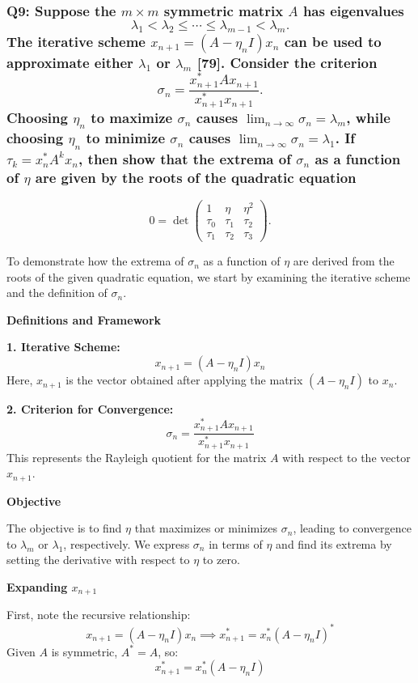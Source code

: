 \documentclass[8pt]{article}
\begin{document}
{{\subsubsection*{Q9: Suppose the \(m \times m\) symmetric matrix \(A\) has eigenvalues
\[
\lambda_1 < \lambda_2 \le \cdots \le \lambda_{m-1} < \lambda_m.
\]
The iterative scheme \(x_{n+1} = (A - \eta_n I)x_n\) can be used to approximate either \(\lambda_1\) or \(\lambda_m\) [79]. Consider the criterion
\[
\sigma_n = \frac{x_{n+1}^* A x_{n+1}}{x_{n+1}^* x_{n+1}}.
\]
Choosing \(\eta_n\) to maximize \(\sigma_n\) causes \(\lim_{n \to \infty} \sigma_n = \lambda_m\), while choosing \(\eta_n\) to minimize \(\sigma_n\) causes \(\lim_{n \to \infty} \sigma_n = \lambda_1\). If \(\tau_k = x_n^* A^k x_n\), then show that the extrema of \(\sigma_n\) as a function of \(\eta\) are given by the roots of the quadratic equation}
\[
0 = \det \begin{pmatrix}
1 & \eta & \eta^2 \\
\tau_0 & \tau_1 & \tau_2 \\
\tau_1 & \tau_2 & \tau_3
\end{pmatrix}.
\]

To demonstrate how the extrema of \(\sigma_n\) as a function of \(\eta\) are derived from the roots of the given quadratic equation, we start by examining the iterative scheme and the definition of \(\sigma_n\).

\textbf{Definitions and Framework}

\textbf{1. Iterative Scheme:}
   \[
   x_{n+1} = (A - \eta_n I)x_n
   \]
   Here, \(x_{n+1}\) is the vector obtained after applying the matrix \((A - \eta_n I)\) to \(x_n\).

\textbf{2. Criterion for Convergence:}
   \[
   \sigma_n = \frac{x_{n+1}^* A x_{n+1}}{x_{n+1}^* x_{n+1}}
   \]
   This represents the Rayleigh quotient for the matrix \(A\) with respect to the vector \(x_{n+1}\).

\textbf{Objective}

The objective is to find \(\eta\) that maximizes or minimizes \(\sigma_n\), leading to convergence to \(\lambda_m\) or \(\lambda_1\), respectively. We express \(\sigma_n\) in terms of \(\eta\) and find its extrema by setting the derivative with respect to \(\eta\) to zero.

\textbf{Expanding \(x_{n+1}\)}

First, note the recursive relationship:
\[
x_{n+1} = (A - \eta_n I)x_n \implies x_{n+1}^* = x_n^* (A - \eta_n I)^*
\]
Given \(A\) is symmetric, \(A^* = A\), so:
\[
x_{n+1}^* = x_n^* (A - \eta_n I)
\]

}}
\end{document}
